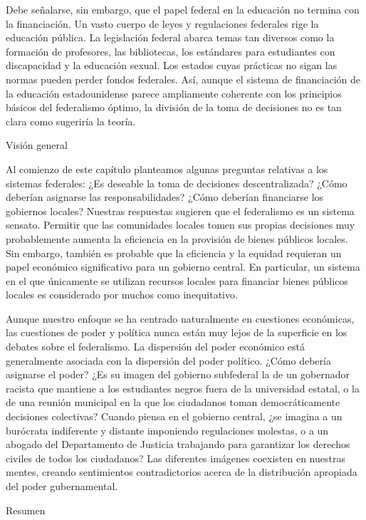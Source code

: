 \documentclass[10pt,a4paper]{article}
\begin{document}
Debe señalarse, sin embargo, que el papel federal en la educación no termina con la financiación. Un vasto cuerpo de leyes y regulaciones federales rige la educación pública. La legislación federal abarca temas tan diversos como la formación de profesores, las bibliotecas, los estándares para estudiantes con discapacidad y la educación sexual. Los estados cuyas prácticas no sigan las normas pueden perder fondos federales. Así, aunque el sistema de financiación de la educación estadounidense parece ampliamente coherente con los principios básicos del federalismo óptimo, la división de la toma de decisiones no es tan clara como sugeriría la teoría.




Visión general

Al comienzo de este capítulo planteamos algunas preguntas relativas a los sistemas federales: ¿Es deseable la toma de decisiones descentralizada? ¿Cómo deberían asignarse las responsabilidades? ¿Cómo deberían financiarse los gobiernos locales? Nuestras respuestas sugieren que el federalismo es un sistema sensato. Permitir que las comunidades locales tomen sus propias decisiones muy probablemente aumenta la eficiencia en la provisión de bienes públicos locales. Sin embargo, también es probable que la eficiencia y la equidad requieran un papel económico significativo para un gobierno central. En particular, un sistema en el que únicamente se utilizan recursos locales para financiar bienes públicos locales es considerado por muchos como inequitativo.

Aunque nuestro enfoque se ha centrado naturalmente en cuestiones económicas, las cuestiones de poder y política nunca están muy lejos de la superficie en los debates sobre el federalismo. La dispersión del poder económico está generalmente asociada con la dispersión del poder político. ¿Cómo debería asignarse el poder? ¿Es su imagen del gobierno subfederal la de un gobernador racista que mantiene a los estudiantes negros fuera de la universidad estatal, o la de una reunión municipal en la que los ciudadanos toman democráticamente decisiones colectivas? Cuando piensa en el gobierno central, ¿se imagina a un burócrata indiferente y distante imponiendo regulaciones molestas, o a un abogado del Departamento de Justicia trabajando para garantizar los derechos civiles de todos los ciudadanos? Las diferentes imágenes coexisten en nuestras mentes, creando sentimientos contradictorios acerca de la distribución apropiada del poder gubernamental.

Resumen
\end{document}
